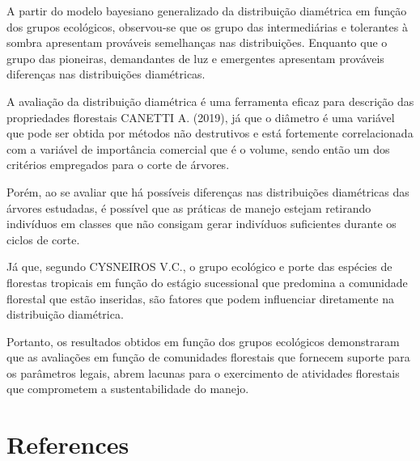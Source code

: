 \documentclass[
]{article}
\begin{document}
A partir do modelo bayesiano generalizado da distribuição diamétrica em
função dos grupos ecológicos, observou-se que os grupo das
intermediárias e tolerantes à sombra apresentam prováveis semelhanças
nas distribuições. Enquanto que o grupo das pioneiras, demandantes de
luz e emergentes apresentam prováveis diferenças nas distribuições
diamétricas.

A avaliação da distribuição diamétrica é uma ferramenta eficaz para
descrição das propriedades florestais CANETTI A. (2019), já que o
diâmetro é uma variável que pode ser obtida por métodos não destrutivos
e está fortemente correlacionada com a variável de importância comercial
que é o volume, sendo então um dos critérios empregados para o corte de
árvores.

Porém, ao se avaliar que há possíveis diferenças nas distribuições
diamétricas das árvores estudadas, é possível que as práticas de manejo
estejam retirando indivíduos em classes que não consigam gerar
indivíduos suficientes durante os ciclos de corte.

Já que, segundo CYSNEIROS V.C., o grupo ecológico e porte das espécies
de florestas tropicais em função do estágio sucessional que predomina a
comunidade florestal que estão inseridas, são fatores que podem
influenciar diretamente na distribuição diamétrica.

Portanto, os resultados obtidos em função dos grupos ecológicos
demonstraram que as avaliações em função de comunidades florestais que
fornecem suporte para os parâmetros legais, abrem lacunas para o
exercimento de atividades florestais que comprometem a sustentabilidade
do manejo.

\hypertarget{references}{%
\section*{References}\label{references}}
\end{document}
